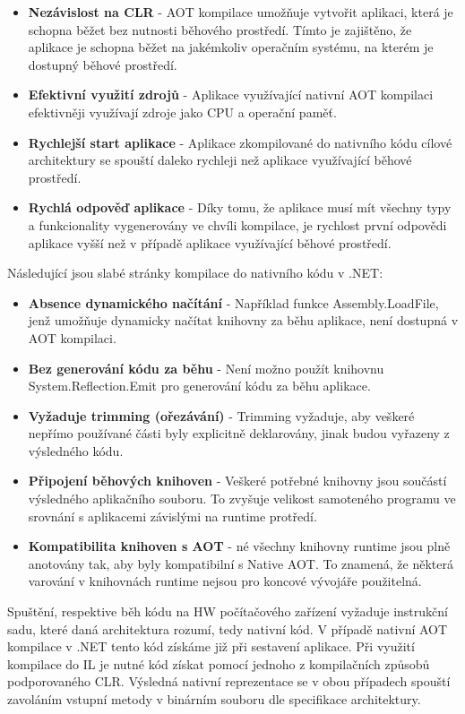 \begin{itemize}
    \item  \textbf{Nezávislost na CLR} - AOT kompilace umožňuje vytvořit aplikaci, která je schopna běžet bez nutnosti běhového prostředí. Tímto je zajištěno, že aplikace je schopna běžet na jakémkoliv operačním systému, na kterém je dostupný běhové prostředí.
    \item \textbf{Efektivní využití zdrojů} - Aplikace využívající nativní AOT kompilaci efektivněji využívají zdroje jako CPU a operační paměť.
    \item \textbf{Rychlejší start aplikace} - Aplikace zkompilované do nativního kódu cílové architektury se spouští daleko rychleji než aplikace využívající běhové prostředí.
    \item \textbf{Rychlá odpověď aplikace} - Díky tomu, že aplikace musí mít všechny typy a funkcionality vygenerovány ve chvíli kompilace, je rychlost první odpovědi aplikace vyšší než v případě aplikace využívající běhové prostředí.
\end{itemize}

Následující jsou slabé stránky kompilace do nativního kódu v .NET:

\begin{itemize}
    \item \textbf{Absence dynamického načítání} - Například funkce Assembly.LoadFile, jenž umožňuje dynamicky načítat knihovny za běhu aplikace, není dostupná v AOT kompilaci.
    \item \textbf{Bez generování kódu za běhu} - Není možno použít knihovnu System.Reflection.Emit pro generování kódu za běhu aplikace.
    \item \textbf{Vyžaduje trimming (ořezávání)} - Trimming vyžaduje, aby veškeré nepřímo používané části byly explicitně deklarovány, jinak budou vyřazeny z výsledného kódu.
    \item \textbf{Připojení běhových knihoven} - Veškeré potřebné knihovny jsou součástí výsledného aplikačního souboru. To zvyšuje velikost samoteného programu ve srovnání s aplikacemi závislými na runtime protředí.
    \item \textbf{Kompatibilita knihoven s AOT} - né všechny knihovny runtime jsou plně anotovány tak, aby byly kompatibilní s Native AOT. To znamená, že některá varování v knihovnách runtime nejsou pro koncové vývojáře použitelná.
\end{itemize}


Spuštění, respektive běh kódu na HW počítačového zařízení vyžaduje instrukční sadu, které daná architektura rozumí, tedy nativní kód. V případě nativní AOT kompilace v .NET tento kód získáme již při sestavení aplikace. Při využití kompilace do IL je nutné kód získat pomocí jednoho z kompilačních způsobů podporovaného CLR. Výsledná nativní reprezentace se v obou případech spouští zavoláním vstupní metody v binárním souboru dle specifikace architektury.


